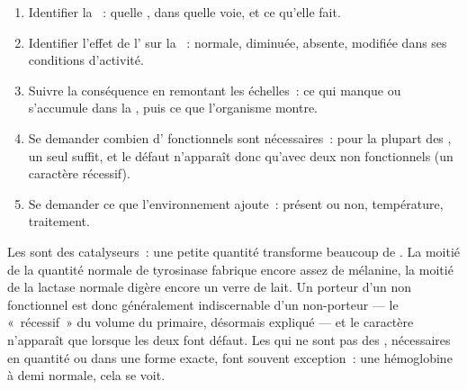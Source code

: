 \begin{method}\label{met:g11:enzymes-and-phenotype:reason}
\begin{enumerate}
  \item Identifier la ~: quelle , dans quelle voie, et ce
        qu'elle fait.
  \item Identifier l'effet de l' sur la ~: normale,
        diminuée, absente, modifiée dans ses conditions d'activité.
  \item Suivre la conséquence en remontant les échelles~: ce qui manque
        ou s'accumule dans la , puis ce que l'organisme montre.
  \item Se demander combien d' fonctionnels sont nécessaires~:
        pour la plupart des , un seul suffit, et le défaut
        n'apparaît donc qu'avec deux  non fonctionnels (un
        caractère récessif).
  \item Se demander ce que l'environnement ajoute~:  présent ou
        non, température, traitement.
\end{enumerate}
\end{method}

\begin{remark}\label{rem:g11:enzymes-and-phenotype:recessive}
Les  sont des catalyseurs~: une petite quantité transforme
beaucoup de . La moitié de la quantité normale de tyrosinase
fabrique encore assez de mélanine, la moitié de la lactase normale
digère encore un verre de lait. Un porteur d'un  non fonctionnel
est donc généralement indiscernable d'un non-porteur --- le
«~récessif~» du volume du primaire, désormais expliqué --- et le
caractère n'apparaît que lorsque les deux  font défaut. Les
 qui ne sont pas des , nécessaires en quantité ou dans
une forme exacte, font souvent exception~: une hémoglobine à demi
normale, cela se voit.
\end{remark}

